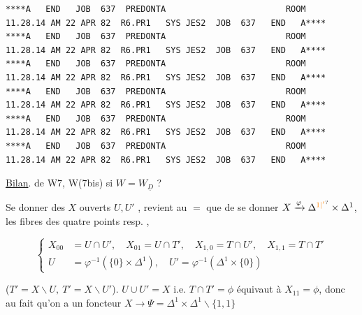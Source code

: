 {\fontsize{4.1pt}{4.8pt}\selectfont
\begin{verbatim}
****A   END   JOB  637  PREDONTA                        ROOM       11.28.14 AM 22 APR 82  R6.PR1   SYS JES2  JOB  637   END   A****
****A   END   JOB  637  PREDONTA                        ROOM       11.28.14 AM 22 APR 82  R6.PR1   SYS JES2  JOB  637   END   A****
****A   END   JOB  637  PREDONTA                        ROOM       11.28.14 AM 22 APR 82  R6.PR1   SYS JES2  JOB  637   END   A****
****A   END   JOB  637  PREDONTA                        ROOM       11.28.14 AM 22 APR 82  R6.PR1   SYS JES2  JOB  637   END   A****
****A   END   JOB  637  PREDONTA                        ROOM       11.28.14 AM 22 APR 82  R6.PR1   SYS JES2  JOB  637   END   A****
****A   END   JOB  637  PREDONTA                        ROOM       11.28.14 AM 22 APR 82  R6.PR1   SYS JES2  JOB  637   END   A****
\end{verbatim}
}






\uline{Bilan}. de W7, W(7bis) si $W=W_{\underline D}$ ?

Se donner des $X$ ouverts $U,U'$ , revient au $=$ que de se donner $X\xrightarrow{\varphi}\Delta^{\unsure{1|'}}\times\Delta^1$, les fibres des quatre points  resp. ,

\[
\left\{\begin{aligned}
 X_{00}&=U\cap U',\quad X_{01}=U\cap T',\quad X_{1,0}=T\cap U',\quad X_{1,1}=T\cap T'\\
 U&=\varphi^{-1}(\{0\}\times\Delta^1),\quad U'=\varphi^{-1}(\Delta^1\times\{0\})
\end{aligned}\right.
\]

 ($T'=X\smallsetminus U,\ T'=X\smallsetminus U'$).  $U\cup U'=X$ i.e. $T\cap T'=\phi$ équivaut à $X_{11}=\phi$, donc au fait qu'on a un foncteur $X\to\Psi=\Delta^1\times\Delta^1\smallsetminus\{1,1\}$

